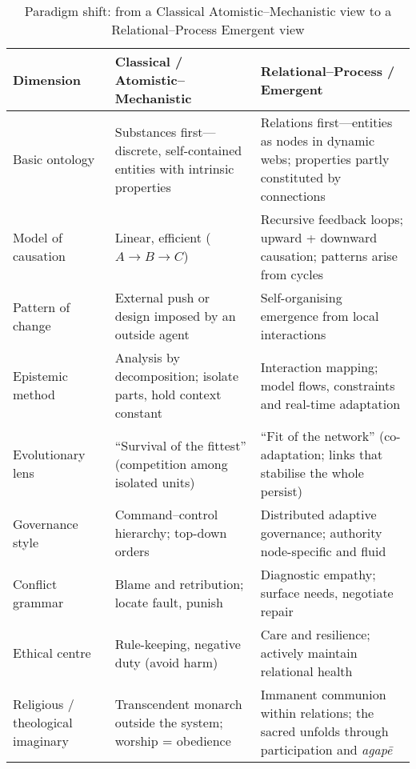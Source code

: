\begin{table}[ht]
\centering
\caption{Paradigm shift: from a Classical Atomistic--Mechanistic view to a Relational--Process Emergent view}
\label{tab:paradigm-shift}
\begin{tabularx}{\textwidth}{@{}p{3.2cm}X X@{}}
\toprule
\textbf{Dimension} &
\textbf{Classical / Atomistic--Mechanistic} &
\textbf{Relational--Process / Emergent} \\
\midrule
Basic ontology &
Substances first—discrete, self-contained entities with intrinsic properties &
Relations first—entities as nodes in dynamic webs; properties partly constituted by connections \\[0.4em]

Model of causation &
Linear, efficient (\(A \rightarrow B \rightarrow C\)) &
Recursive feedback loops; upward + downward causation; patterns arise from cycles \\[0.4em]

Pattern of change &
External push or design imposed by an outside agent &
Self-organising emergence from local interactions \\[0.4em]

Epistemic method &
Analysis by decomposition; isolate parts, hold context constant &
Interaction mapping; model flows, constraints and real-time adaptation \\[0.4em]

Evolutionary lens &
“Survival of the fittest” (competition among isolated units) &
“Fit of the network” (co-adaptation; links that stabilise the whole persist) \\[0.4em]

Governance style &
Command–control hierarchy; top-down orders &
Distributed adaptive governance; authority node-specific and fluid \\[0.4em]

Conflict grammar &
Blame and retribution; locate fault, punish &
Diagnostic empathy; surface needs, negotiate repair \\[0.4em]

Ethical centre &
Rule-keeping, negative duty (avoid harm) &
Care and resilience; actively maintain relational health \\[0.4em]

Religious / theological imaginary &
Transcendent monarch outside the system; worship = obedience &
Immanent communion within relations; the sacred unfolds through participation and \textit{agapē} \\
\bottomrule
\end{tabularx}
\end{table}
